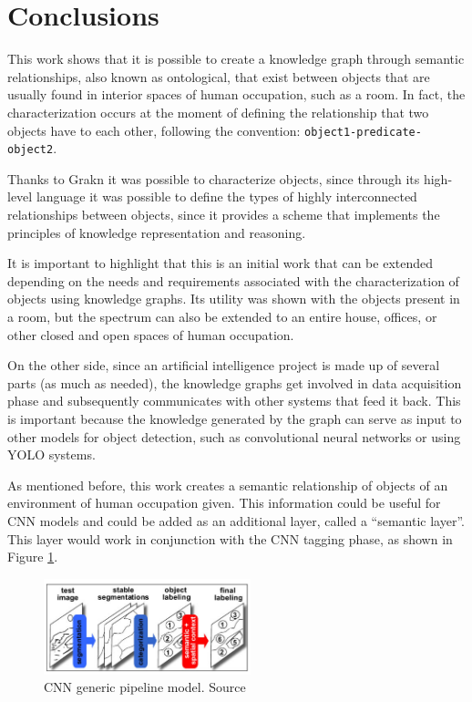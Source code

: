 \section{Conclusions}
This work shows that it is possible to create a knowledge graph through 
semantic relationships, also known as ontological, that exist between objects 
that are usually found in interior spaces of human occupation, such as a room. 
In fact, the characterization occurs at the moment of defining the relationship 
that two objects have to each other, following the convention: 
\texttt{object1-predicate-object2}.

Thanks to Grakn it was possible to characterize objects, since through its 
high-level language it was possible to define the types of highly interconnected 
relationships between objects, since it provides a scheme that implements the 
principles of knowledge representation and reasoning.

It is important to highlight that this is an initial work that can be extended 
depending on the needs and requirements associated with the characterization 
of objects using knowledge graphs. Its utility was shown with the objects 
present in a room, but the spectrum can also be extended to an entire house, 
offices, or other closed and open spaces of human occupation.

On the other side, since an artificial intelligence project is made up of 
several parts (as much as needed), the knowledge graphs get involved in 
data acquisition phase and subsequently communicates with other 
systems that feed it back. This is important because the knowledge generated by 
the graph can serve as input to other models for object detection, such as 
convolutional neural networks or using YOLO systems.

As mentioned before, this work creates a semantic relationship of objects of an 
environment of human occupation given. This information could be useful for 
CNN models and could be added as an additional layer, called a 
``semantic layer''. This layer would work in conjunction with the CNN 
tagging phase, as shown in Figure \ref{fig:pipeline}.

\begin{figure}[H]
    \centering
    \includegraphics[width=6cm]{figures/pipeline.png}
    \caption{CNN generic pipeline model. Source \cite{Galleguillos2}}
    \label{fig:pipeline}
\end{figure}

